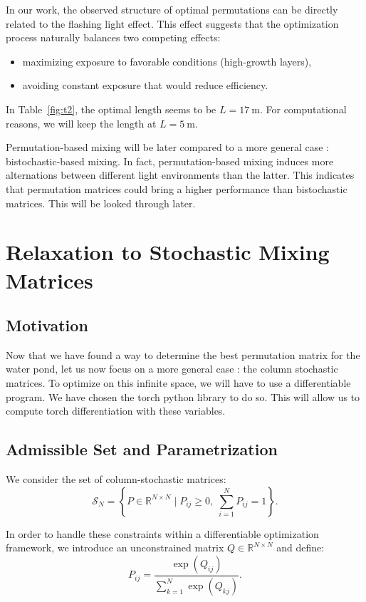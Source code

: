 \documentclass{article}
\begin{document}
In our work, the observed structure of optimal permutations can be directly related to the flashing light effect.
This effect suggests that the optimization process naturally balances two competing effects:
\begin{itemize}
    \item maximizing exposure to favorable conditions (high-growth layers),
    \item avoiding constant exposure that would reduce efficiency.
\end{itemize}

In Table~\ref{fig:t2}, the optimal length seems to be $L = 17 \ \mathrm{m}$. For computational reasons, we will keep the length at $L = 5 \ \mathrm{m}$.

Permutation-based mixing will be later compared to a more general case : bistochastic-based mixing. 
In fact, permutation-based mixing induces more alternations between different light environments than the latter. This indicates that permutation 
matrices could bring a higher performance than bistochastic matrices. This will be looked through later.

\section{Relaxation to Stochastic Mixing Matrices}

\subsection{Motivation}

Now that we have found a way to determine the best permutation matrix for the water pond, let us now focus on a more general case : the column stochastic matrices. 
To optimize on this infinite space, we will have to use a differentiable program.
We have chosen the torch python library to do so. This will allow us to compute torch differentiation with these variables.

\subsection{Admissible Set and Parametrization}

We consider the set of column-stochastic matrices:
\[
\mathcal{S}_N = \left\{ P \in \mathbb{R}^{N \times N} \mid P_{ij} \geq 0, \; \sum_{i=1}^{N} P_{ij} = 1 \right\}.
\]

In order to handle these constraints within a differentiable optimization framework, 
we introduce an unconstrained matrix $Q \in \mathbb{R}^{N \times N}$ and define:
\[
P_{ij} = \frac{\exp(Q_{ij})}{\sum_{k=1}^{N} \exp(Q_{kj})}.
\]
\end{document}
